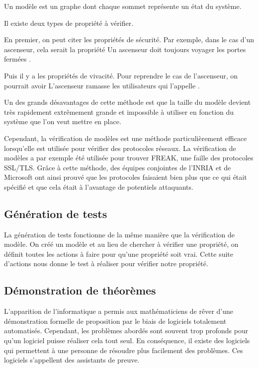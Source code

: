 \documentclass[12pt]{report}
\begin{document}
Un modèle est un graphe dont chaque sommet représente un état du système.

Il existe deux types de propriété à vérifier.

En premier, on peut citer les propriétés de sécurité. Par exemple, dans le cas d'un ascenseur, cela serait la propriété \og Un ascenseur doit toujours voyager les portes fermées \fg.

Puis il y a les propriétés de vivacité. Pour reprendre le cas de l'ascenseur, on pourrait avoir \og L'ascenseur ramasse les utilisateurs qui l'appelle \fg.   

Un des grands désavantages de cette méthode est que la taille du modèle devient très rapidement extrêmement grande et impossible à utiliser en fonction du système que l'on veut mettre en place.
   
Cependant, la vérification de modèles est une méthode particulièrement efficace lorsqu'elle est utilisée pour vérifier des protocoles réseaux. La vérification de modèles a par exemple été utilisée pour trouver FREAK, une faille des protocoles SSL/TLS. Grâce à cette méthode, des équipes conjointes de l'INRIA et de Microsoft ont ainsi prouvé que les protocoles faisaient bien plus que ce qui était spécifié et que cela était à l'avantage de potentiels attaquants\cite{goubault}.    

\subsection{Génération de tests}
La génération de tests fonctionne de la même manière que la vérification de modèle. On créé un modèle et au lieu de chercher à vérifier une propriété, on définit toutes les actions à faire pour qu'une propriété soit vrai. Cette suite d'actions nous donne le test à réaliser pour vérifier notre propriété\cite{griffault}.

\subsection{Démonstration de théorèmes}
L'apparition de l'informatique a permis aux mathématiciens de rêver d'une démonstration formelle de proposition par le biais de logiciels totalement automatisés. Cependant, les problèmes abordés sont souvent trop profonds pour qu'un logiciel puisse réaliser cela tout seul. En conséquence, il existe des logiciels qui permettent à une personne de résoudre plus facilement des problèmes. Ces logiciels s'appellent des assistants de preuve. 
\end{document}
